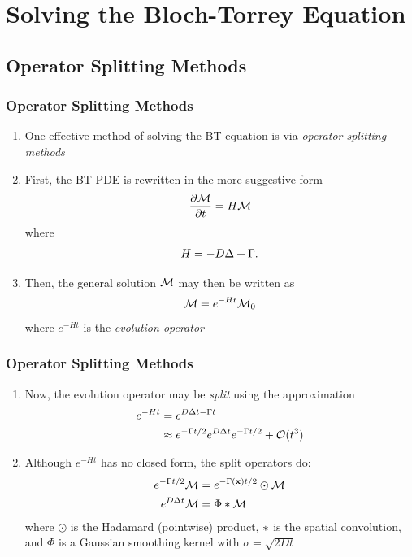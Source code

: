 \begin{frame}

\end{frame}


\section{Solving the Bloch-Torrey Equation}


\subsection{Operator Splitting Methods}

\begin{frame}
\frametitle{Operator Splitting Methods}
\begin{enumerate}
    \item One effective method of solving the BT equation is via \textit{operator splitting methods}
    \item First, the BT PDE is rewritten in the more suggestive form
    $$ \frac{\partial \mathcal{M}}{\partial t} = H \mathcal{M} $$
    where
    \begin{gather*}
        H = -D \mbox{$\Delta$}{} + \Gamma.
    \end{gather*}
    \item Then, the general solution $\mathcal{M}$ may then be written as
    $$ \mathcal{M} = e^{-Ht}\mathcal{M}_0 $$
    where $e^{-Ht}$ is the \textit{evolution operator}
\end{enumerate}
\end{frame}

\begin{frame}
\frametitle{Operator Splitting Methods}
\begin{enumerate}
    \item Now, the evolution operator may be \textit{split} using the approximation %
    \begin{align*}
        e^{-Ht} &= e^{D \Delta t - \Gamma t} \\
        &\approx e^{-\Gamma t/2} e^{D \Delta t} e^{-\Gamma t/2} + \mathcal{O}(t^3)
    \end{align*}
    \item Although $e^{-Ht}$ has no closed form, the split operators do:
    \begin{align*}
        e^{-\Gamma t/2} \mathcal{M} &= e^{-\Gamma(\mathbf{x}) t/2} \odot \mathcal{M} \\
        e^{D \Delta t} \mathcal{M} &= \Phi \ast \mathcal{M}
    \end{align*}
    where $\odot$ is the Hadamard (pointwise) product, $\ast$ is the spatial convolution, and $\Phi$ is a Gaussian smoothing kernel with $\sigma = \sqrt{2Dt}$
\end{enumerate}
\end{frame}


